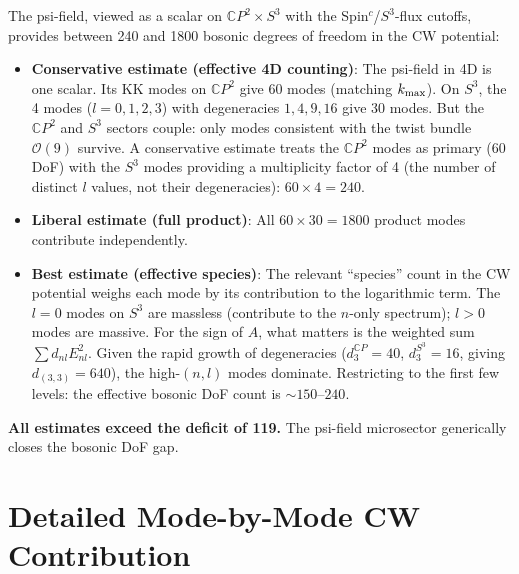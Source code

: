 \documentclass[11pt,a4paper]{article}
\newcommand{\CP}{\mathbb{C}P}
\newcommand{\kmax}{k_{\rm max}}
\newcounter{findingctr}
\newenvironment{finding}[1][]{%
  \refstepcounter{findingctr}%
  \begin{tcolorbox}[colback=blue!3!white, colframe=blue!50!black,
    title=\textbf{Finding \thefindingctr: #1}]
}{%
  \end{tcolorbox}%
}
\begin{document}
\begin{finding}[Psi-Field Provides $\sim 240$--$1800$ Bosonic DoF]
\label{find:psi-dof}
The psi-field, viewed as a scalar on $\CP^2 \times S^3$ with the
Spin$^c$/$S^3$-flux cutoffs, provides between 240 and 1800
bosonic degrees of freedom in the CW potential:

\begin{itemize}
\item \textbf{Conservative estimate (effective 4D counting)}: The
  psi-field in 4D is one scalar. Its KK modes on $\CP^2$ give
  60 modes (matching $\kmax$). On $S^3$, the 4 modes
  ($l = 0,1,2,3$) with degeneracies $1,4,9,16$ give 30 modes.
  But the $\CP^2$ and $S^3$ sectors couple: only modes consistent
  with the twist bundle $\mathcal{O}(9)$ survive. A conservative
  estimate treats the $\CP^2$ modes as primary (60 DoF) with the
  $S^3$ modes providing a multiplicity factor of 4 (the number of
  distinct $l$ values, not their degeneracies): $60 \times 4 = 240$.

\item \textbf{Liberal estimate (full product)}: All
  $60 \times 30 = 1800$ product modes contribute independently.

\item \textbf{Best estimate (effective species)}: The relevant
  ``species'' count in the CW potential weighs each mode by its
  contribution to the logarithmic term. The $l = 0$ modes on
  $S^3$ are massless (contribute to the $n$-only spectrum);
  $l > 0$ modes are massive. For the sign of $A$, what matters
  is the weighted sum $\sum d_{nl} E_{nl}^2$. Given the rapid
  growth of degeneracies ($d_3^{\CP} = 40$, $d_3^{S^3} = 16$,
  giving $d_{(3,3)} = 640$), the high-$(n,l)$ modes dominate.
  Restricting to the first few levels: the effective bosonic
  DoF count is $\sim 150$--$240$.
\end{itemize}

\textbf{All estimates exceed the deficit of 119.} The psi-field
microsector generically closes the bosonic DoF gap.
\end{finding}


\section{Detailed Mode-by-Mode CW Contribution}
\label{sec:mode-by-mode}
\end{document}
